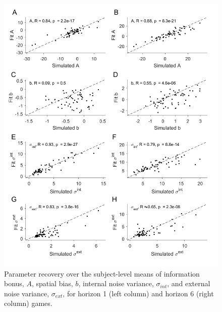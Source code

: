 \documentclass[12pt]{article}
\begin{document}
	\begin{figure}[H]
		\begin{center}
			\includegraphics[width=1\textwidth]{figures/precover.png}
			\caption{Parameter recovery over the subject-level means of information bonus, $A$, spatial bias, $b$, internal noise variance, $\sigma_{int}$, and external noise variance, $\sigma_{ext}$, for horizon 1 (left column) and horizon 6 (right column) games. %
			}
			\label{fig:pararecover1}
		\end{center}
	\end{figure} 
\end{document}
